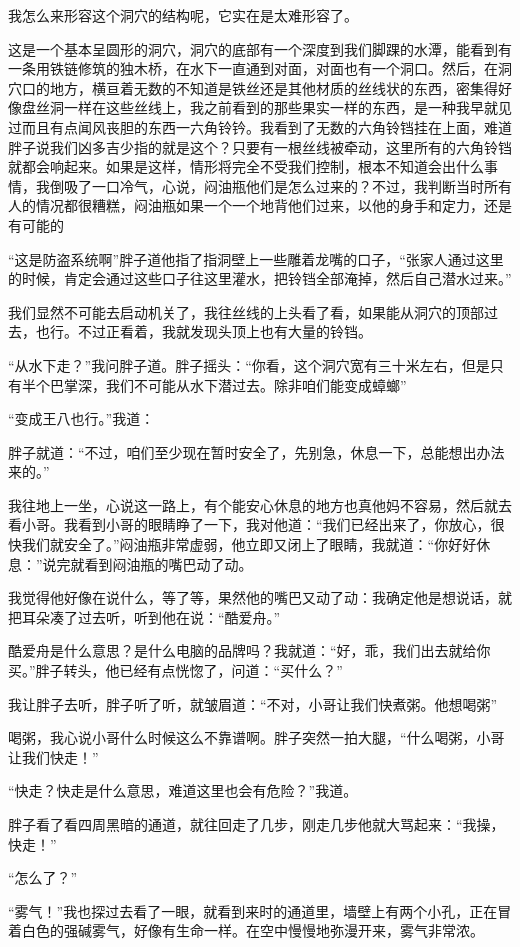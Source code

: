 我怎么来形容这个洞穴的结构呢，它实在是太难形容了。

这是一个基本呈圆形的洞穴，洞穴的底部有一个深度到我们脚踝的水潭，能看到有一条用铁链修筑的独木桥，在水下一直通到对面，对面也有一个洞口。然后，在洞穴口的地方，横亘着无数的不知道是铁丝还是其他材质的丝线状的东西，密集得好像盘丝洞一样在这些丝线上，我之前看到的那些果实一样的东西，是一种我早就见过而且有点闻风丧胆的东西一六角铃钤。我看到了无数的六角铃铛挂在上面，难道胖子说我们凶多吉少指的就是这个？只要有一根丝线被牵动，这里所有的六角铃铛就都会响起来。如果是这样，情形将完全不受我们控制，根本不知道会出什么事情，我倒吸了一口冷气，心说，闷油瓶他们是怎么过来的？不过，我判断当时所有人的情况都很糟糕，闷油瓶如果一个一个地背他们过来，以他的身手和定力，还是有可能的

“这是防盗系统啊”胖子道他指了指洞壁上一些雕着龙嘴的口子，“张家人通过这里的时候，肯定会通过这些口子往这里灌水，把铃铛全部淹掉，然后自己潜水过来。”

我们显然不可能去启动机关了，我往丝线的上头看了看，如果能从洞穴的顶部过去，也行。不过正看着，我就发现头顶上也有大量的铃铛。

“从水下走？”我问胖子道。胖子摇头：“你看，这个洞穴宽有三十米左右，但是只有半个巴掌深，我们不可能从水下潜过去。除非咱们能变成蟑螂”

“变成王八也行。”我道：

胖子就道：“不过，咱们至少现在暂时安全了，先别急，休息一下，总能想出办法来的。”

我往地上一坐，心说这一路上，有个能安心休息的地方也真他妈不容易，然后就去看小哥。我看到小哥的眼睛睁了一下，我对他道：“我们已经出来了，你放心，很快我们就安全了。”闷油瓶非常虚弱，他立即又闭上了眼睛，我就道：“你好好休息：”说完就看到闷油瓶的嘴巴动了动。

我觉得他好像在说什么，等了等，果然他的嘴巴又动了动：我确定他是想说话，就把耳朵凑了过去听，听到他在说：“酷爱舟。”

酷爱舟是什么意思？是什么电脑的品牌吗？我就道：“好，乖，我们出去就给你买。”胖子转头，他已经有点恍惚了，问道：“买什么？”

我让胖子去听，胖子听了听，就皱眉道：“不对，小哥让我们快煮粥。他想喝粥”

喝粥，我心说小哥什么时候这么不靠谱啊。胖子突然一拍大腿，“什么喝粥，小哥让我们快走！”

“快走？快走是什么意思，难道这里也会有危险？”我道。

胖子看了看四周黑暗的通道，就往回走了几步，刚走几步他就大骂起来：“我操，快走！”

“怎么了？”

“雾气！”我也探过去看了一眼，就看到来时的通道里，墙壁上有两个小孔，正在冒着白色的强碱雾气，好像有生命一样。在空中慢慢地弥漫开来，雾气非常浓。

